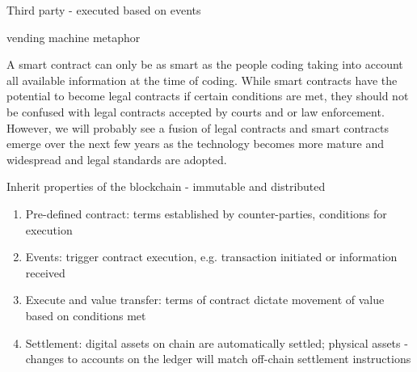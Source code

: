 Third party - executed based on events

vending machine metaphor 

A smart contract can only be as smart as the people coding taking into account all available information at the time of coding.
While smart contracts have the potential to become legal contracts if certain conditions are met, they should not be confused with legal contracts accepted by courts and or law enforcement. However, we will probably see a fusion of legal contracts and smart contracts emerge over the next few years as the technology becomes more mature and widespread and legal standards are adopted.

Inherit properties of the blockchain - immutable and distributed

\begin{enumerate}
\item Pre-defined contract: terms established by counter-parties, conditions for execution
\item Events: trigger contract execution, e.g. transaction initiated or information received
\item Execute and value transfer: terms of contract dictate movement of value based on conditions met
\item Settlement: digital assets on chain are automatically settled; physical assets - changes to accounts on the ledger will match off-chain settlement instructions
\end{enumerate}

